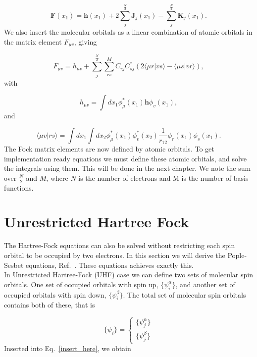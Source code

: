 \documentclass[a4paper,norsk,11pt,twoside]{report}
\begin{document}
\begin{equation}
\textbf{F}(x_1) = \textbf{h}(x_1)  + 2 \sum_j^{\frac{N}{2}} \textbf{J}_j(x_1) - \sum_j^{\frac{N}{2}} \textbf{K}_j(x_1)  .
\end{equation}
We also insert the molecular orbitals as a linear combination of atomic orbitals in the matrix element $F_{\mu v}$, giving

\begin{equation}
F_{\mu v} = h_{\mu v} 
+ \sum_j^{\frac{N}{2}} \sum_{r s}^M
C_{r j} C_{s j}^*
\left( 2 \langle \mu r | v s \rangle 
- \langle \mu s | v r \rangle \right) ,
\label{Fock_Restricted_1}
\end{equation}
with 

\begin{equation}
h_{\mu v} = \int dx_1 \phi_{\mu}^*(x_1) \textbf{h} \phi_v(x_1) ,
\end{equation}
and

\begin{equation}
\langle \mu v | r s \rangle = \int dx_1 \int dx_2 \phi_{\mu}^*(x_1) \phi_v^*(x_2) \frac{1}{r_{12}} \phi_r(x_1) \phi_s(x_1) .
\end{equation}
The Fock matrix elements are now defined by atomic orbitals. To get
implementation ready equations we must define these atomic orbitals,
and solve the integrals using them. This will be done in the next
chapter. We note the sum over $\frac{N}{2}$ and $M$, where $N$ is the
number of electrons and M is the number of basis functions. 

\section{Unrestricted Hartree Fock}
The Hartree-Fock equations can also be solved without restricting each
spin orbital to be occupied by two electrons. In this section we will
derive the Pople-Sesbet equations, Ref.~\cite{ref222222}.  These equations achieves exactly
this. \\

In Unrestricted Hartree-Fock (UHF) case we can define two sets of
molecular spin orbitals. One set of occupied orbitals with spin up,
$\{ \psi_i^{\alpha} \}$, and another set of occupied orbitals with
spin down, $\{ \psi_i^{\beta} \}$. The total set of molecular spin
orbitals contains both of these, that is

\begin{equation}
\{ \psi_i \} = 
\left\{
	\begin{array}{ll}
		\{ \psi_j^{\alpha} \} \\
		\{ \psi_j^{\beta}  \}
	\end{array}
\right .
\end{equation}
Inserted into Eq.~\eqref{insert_here}, we obtain
\end{document}
